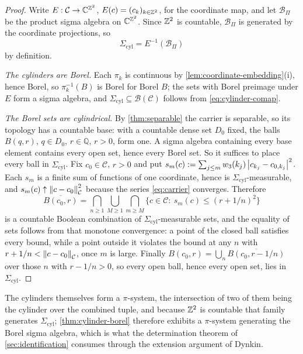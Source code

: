 \begin{proof}
Write $E:\mathcal C\to\mathbb{C}^{\mathbb{Z}^2}$, $E(c)=(c_k)_{k\in\mathbb{Z}^2}$, for the coordinate
map, and let $\mathcal B_\Pi$ be the product sigma algebra on $\mathbb{C}^{\mathbb{Z}^2}$. Since
$\mathbb{Z}^2$ is countable, $\mathcal B_\Pi$ is generated by the coordinate projections,
so
\begin{equation}\label{eq:cylinder-comap}
  \Sigma_{\mathrm{cyl}}=E^{-1}(\mathcal B_\Pi)
\end{equation}
by definition.

\emph{The cylinders are Borel.} Each $\pi_k$ is continuous by
\cref{lem:coordinate-embedding}(i), hence Borel, so $\pi_k^{-1}(B)$ is Borel for
Borel $B$; the sets with Borel preimage under $E$ form a sigma algebra, and
$\Sigma_{\mathrm{cyl}}\subseteq\mathcal B(\mathcal C)$ follows from
\eqref{eq:cylinder-comap}.

\emph{The Borel sets are cylindrical.} By \cref{thm:separable} the carrier is
separable, so its topology has a countable base: with a countable dense set
$D_0$ fixed, the balls $B(q,r)$, $q\in D_0$, $r\in\mathbb{Q}$, $r>0$, form one.
A sigma algebra containing every base element contains every open set, hence
every Borel set. So it suffices to place every ball in $\Sigma_{\mathrm{cyl}}$.
Fix $c_0\in\mathcal C$, $r>0$ and put
$s_m(c):=\sum_{j\le m}w_3(k_j)\left| c_{k_j}-c_{0,k_j} \right|^2$. Each $s_m$ is a finite
sum of functions of one coordinate, hence is
$\Sigma_{\mathrm{cyl}}$-measurable, and $s_m(c)\uparrow\left\| c-c_0 \right\|_{\mathcal
C}^2$ because the series \eqref{eq:carrier} converges. Therefore
\[
  \overline{B(c_0,r)}
  =\bigcap_{n\ge1}\bigcup_{M\ge1}\bigcap_{m\ge M}
  \bigl\{c\in\mathcal C:\ s_m(c)\le(r+1/n)^2\bigr\}
\]
is a countable Boolean combination of $\Sigma_{\mathrm{cyl}}$-measurable sets,
and the equality of sets follows from that monotone convergence: a point of the
closed ball satisfies every bound, while a point outside it violates the bound at
any $n$ with $r+1/n<\left\| c-c_0 \right\|_{\mathcal C}$, once $m$ is large. Finally
$B(c_0,r)=\bigcup_{n}\overline{B(c_0,r-1/n)}$ over those $n$ with $r-1/n>0$, so
every open ball, hence every open set, lies in $\Sigma_{\mathrm{cyl}}$.
\end{proof}

The cylinders themselves form a $\pi$-system, the intersection of two of them
being the cylinder over the combined tuple, and because $\mathbb{Z}^2$ is countable that
family generates $\Sigma_{\mathrm{cyl}}$; \cref{thm:cylinder-borel} therefore
exhibits a $\pi$-system generating the Borel sigma algebra, which is what the
determination theorem of \cref{sec:identification} consumes through the extension
argument of Dynkin.

